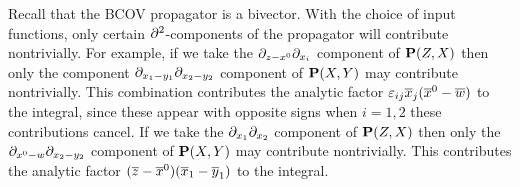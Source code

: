\documentclass[../main.tex]{subfiles}
\begin{document}
Recall that the BCOV propagator is a bivector.
With the choice of input functions, only certain $\partial^2$-components of the propagator will contribute nontrivially.
For example, if we take the $\partial_{z-x^0} \partial_{x_i}$ component of $\mathbf{P}(Z,X)$ then only the component $\partial_{x_1 - y_1} \partial_{x_2-y_2}$ component of $\mathbf{P}(X,Y)$ may contribute nontrivially.
This combination contributes the analytic factor $\varepsilon_{ij} \overline x_j (\overline x^0 - \overline w)$ to the integral, since these appear with opposite signs when $i=1,2$ these contributions cancel.
If we take the $\partial_{x_1} \partial_{x_2}$ component of $\mathbf{P}(Z,X)$ then only the $\partial_{x^0-w} \partial_{x_2-y_2}$ component of $\mathbf{P}(X,Y)$ may contribute nontrivially.
This contributes the analytic factor $(\overline z - \overline x^0) (\overline x_1 - \overline y_1)$ to the integral.

\end{document}

